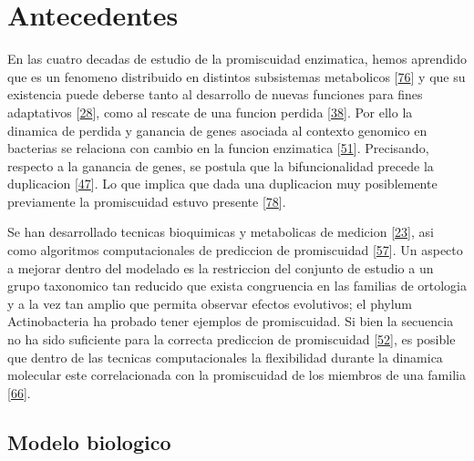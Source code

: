 \documentclass[12pt,twoside]{reedthesis}
\begin{document}
  \section{Antecedentes}\label{antecedentes}
  
  En las cuatro decadas de estudio de la promiscuidad enzimatica, hemos
  aprendido que es un fenomeno distribuido en distintos subsistemas
  metabolicos {[}\protect\hyperlink{ref-nam_network_2012}{76}{]} y que su
  existencia puede deberse tanto al desarrollo de nuevas funciones para
  fines adaptativos {[}\protect\hyperlink{ref-jensen_enzyme_1976}{28}{]},
  como al rescate de una funcion perdida
  {[}\protect\hyperlink{ref-patrick_multicopy_2007}{38}{]}. Por ello la
  dinamica de perdida y ganancia de genes asociada al contexto genomico en
  bacterias se relaciona con cambio en la funcion enzimatica
  {[}\protect\hyperlink{ref-zhao_discovery_2013}{51}{]}. Precisando,
  respecto a la ganancia de genes, se postula que la bifuncionalidad
  precede la duplicacion
  {[}\protect\hyperlink{ref-hughes_evolution_1994}{47}{]}. Lo que implica
  que dada una duplicacion muy posiblemente previamente la promiscuidad
  estuvo presente {[}\protect\hyperlink{ref-gerlt_divergent_2001}{78}{]}.
  
  Se han desarrollado tecnicas bioquimicas y metabolicas de medicion
  {[}\protect\hyperlink{ref-nath_quantitative_2008}{23}{]}, asi como
  algoritmos computacionales de prediccion de promiscuidad
  {[}\protect\hyperlink{ref-carbonell_molecular_2010}{57}{]}. Un aspecto a
  mejorar dentro del modelado es la restriccion del conjunto de estudio a
  un grupo taxonomico tan reducido que exista congruencia en las familias
  de ortologia y a la vez tan amplio que permita observar efectos
  evolutivos; el phylum Actinobacteria ha probado tener ejemplos de
  promiscuidad. Si bien la secuencia no ha sido suficiente para la
  correcta prediccion de promiscuidad
  {[}\protect\hyperlink{ref-verdel-aranda_molecular_2015}{52}{]}, es
  posible que dentro de las tecnicas computacionales la flexibilidad
  durante la dinamica molecular este correlacionada con la promiscuidad de
  los miembros de una familia
  {[}\protect\hyperlink{ref-james_conformational_2003}{66}{]}.
  
  \subsection{Modelo biologico}\label{modelo-biologico}
  
\end{document}
